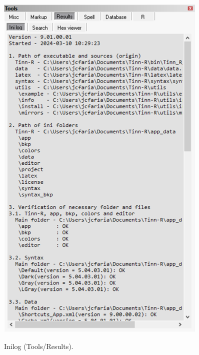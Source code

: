 \begin{figure}[H]
  \includegraphics[scale=0.35]{./res/tools_results_inilog.png}\\
  \caption{Inilog (Tools/Results).}
  \label{fig:tools_results_inilog}
\end{figure}


